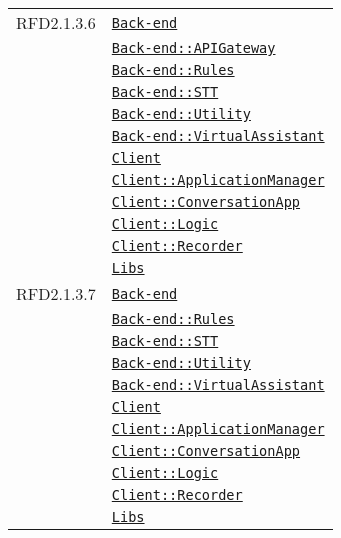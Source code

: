 \begin{longtable}{|>{\centering}m{3cm}|m{10cm}<{\centering}|}
RFD2.1.3.6 & \hyperref[Back-end]{\texttt{Back-end}}\\
& \hyperref[Back-end::APIGateway]{\texttt{Back-end::APIGateway}}\\
& \hyperref[Back-end::Rules]{\texttt{Back-end::Rules}}\\
& \hyperref[Back-end::STT]{\texttt{Back-end::STT}}\\
& \hyperref[Back-end::Utility]{\texttt{Back-end::Utility}}\\
& \hyperref[Back-end::VirtualAssistant]{\texttt{Back-end::VirtualAssistant}}\\
& \hyperref[Client]{\texttt{Client}}\\
& \hyperref[Client::ApplicationManager]{\texttt{Client::ApplicationManager}}\\
& \hyperref[Client::ConversationApp]{\texttt{Client::ConversationApp}}\\
& \hyperref[Client::Logic]{\texttt{Client::Logic}}\\
& \hyperref[Client::Recorder]{\texttt{Client::Recorder}}\\
& \hyperref[Libs]{\texttt{Libs}}\\ \hline

RFD2.1.3.7 & \hyperref[Back-end]{\texttt{Back-end}}\\
& \hyperref[Back-end::Rules]{\texttt{Back-end::Rules}}\\
& \hyperref[Back-end::STT]{\texttt{Back-end::STT}}\\
& \hyperref[Back-end::Utility]{\texttt{Back-end::Utility}}\\
& \hyperref[Back-end::VirtualAssistant]{\texttt{Back-end::VirtualAssistant}}\\
& \hyperref[Client]{\texttt{Client}}\\
& \hyperref[Client::ApplicationManager]{\texttt{Client::ApplicationManager}}\\
& \hyperref[Client::ConversationApp]{\texttt{Client::ConversationApp}}\\
& \hyperref[Client::Logic]{\texttt{Client::Logic}}\\
& \hyperref[Client::Recorder]{\texttt{Client::Recorder}}\\
& \hyperref[Libs]{\texttt{Libs}}\\ \hline


\end{longtable}
